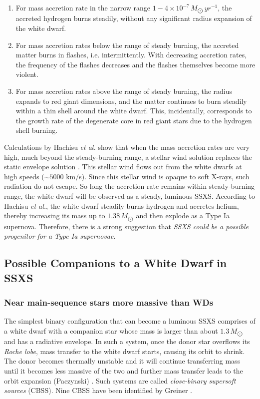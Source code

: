         	\begin{enumerate}
				\item For mass accretion rate in the narrow range $1-4\times 10^{-7}\,M_{\bigodot}\,yr^{-1}$, the accreted hydrogen burns steadily, without any significant radius expansion of the white dwarf.
				\item For mass accretion rates below the range of steady burning, the accreted matter burns in flashes, i.e. intermittently. With decreasing accretion rates, the frequency of the flashes decreases and the flashes themselves become more violent.
				\item For mass accretion rates above the range of steady burning, the radius expands to red giant dimensions, and the matter continues to burn steadily within a thin shell around the white dwarf. This, incidentally, corresponds to the growth rate of the degenerate core in red giant stars due to the hydrogen shell burning.
			\end{enumerate}
			
			Calculations by Hachisu \emph{et al.} show that when the mass accretion rates are very high, much beyond the steady-burning range, a stellar wind solution replaces the static envelope solution \cite{hachisu96}. This stellar wind flows out from the white dwarfs at high speeds ($\sim 5000$ km/s). Since this stellar wind is opaque to soft X-rays, such radiation do not escape. So long the accretion rate remains within steady-burning range, the white dwarf will be observed as a steady, luminous SSXS. According to Hachisu \emph{et al.}, the white dwarf steadily burns hydrogen and accretes helium, thereby increasing its mass up to $1.38\,M_{\bigodot}$ and then explode as a Type Ia supernova. Therefore, there is a strong suggestion that \emph{SSXS could be a possible progenitor for a Type Ia supernovae}.
		
		\subsection{Possible Companions to a White Dwarf in SSXS} \label{introduction:current_status:wd-companions}
			\subsubsection{Near main-sequence stars more massive than WDs}
				The simplest binary configuration that can become a luminous SSXS comprises of a white dwarf with a companion star whose mass is larger than about $1.3\,M_{\bigodot}$ and has a radiative envelope. In such a system, once the donor star overflows its \emph{Roche lobe}, mass transfer to the white dwarf starts, causing its orbit to shrink. The donor becomes thermally unstable and it will continue transferring mass until it becomes less massive of the two and further mass transfer leads to the orbit expansion (Paczynski) \cite{paczynski71}. Such systems are called \emph{close-binary supersoft sources} (CBSS). Nine CBSS have been identified by Greiner \cite{greiner2000catalog,greiner2000catalogOnline}.
				
